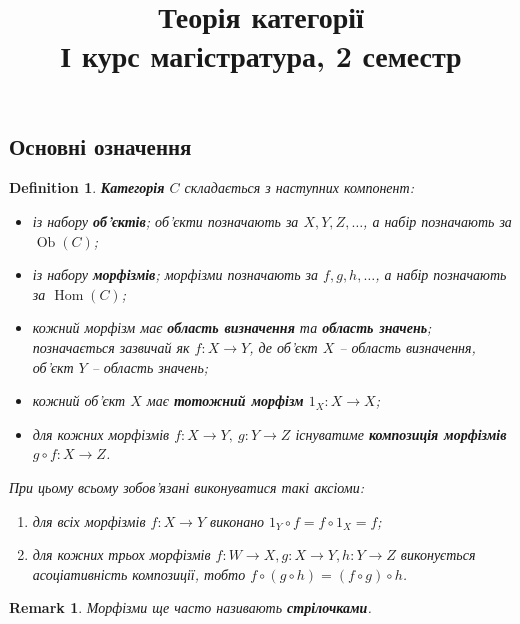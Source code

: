 \documentclass[a4paper, 10pt]{article}
\title{Теорія категорії \\ І курс магістратура, 2 семестр}
\theoremstyle{theoremdd}
\newtheorem{definition}[theorem]{Definition}
\newtheorem{remark}[theorem]{Remark}
\DeclareMathOperator{\Ob}{Ob}
\DeclareMathOperator{\Hom}{Hom}
\begin{document}
\maketitle
\newpage
\subsection{Основні означення}
\begin{definition}
\textbf{Категорія} $C$ складається з наступних компонент:
\begin{itemize}[nosep, wide=0pt, label={--}]
\item із набору \textbf{об'єктів}; об'єкти позначають за $X,Y,Z,\dots$, а набір позначають за $\Ob(C)$;
\item із набору \textbf{морфізмів}; морфізми позначають за $f,g,h,\dots$, а набір позначають за  $\Hom(C)$;
\item кожний морфізм має \textbf{область визначення} та \textbf{область значень}; позначається зазвичай як $f \colon X \to Y$, де об'єкт $X$ -- область визначення, об'єкт $Y$ -- область значень;
\item кожний об'єкт $X$ має \textbf{тотожний морфізм} $1_X \colon X \to X$;
\item для кожних морфізмів $f \colon X \to Y,\ g \colon Y \to Z$ існуватиме \textbf{композиція морфізмів} $g \circ f \colon X \to Z$.
\end{itemize}
При цьому всьому зобов'язані виконуватися такі аксіоми:
\begin{center}
\begin{enumerate}[nosep,wide=0pt,label={\arabic*)}]
\item для всіх морфізмів $f \colon X \to Y$ виконано $1_Y \circ f = f \circ 1_X = f$;
\item для кожних трьох морфізмів $f \colon W \to X, g \colon X \to Y, h \colon Y \to Z$ виконується асоціативність композиції, тобто $f \circ (g \circ h) = (f \circ g) \circ h$.
\end{enumerate}
\end{center}
\end{definition}

\begin{remark}
Морфізми ще часто називають \textbf{стрілочками}.
\end{remark}
\end{document}
